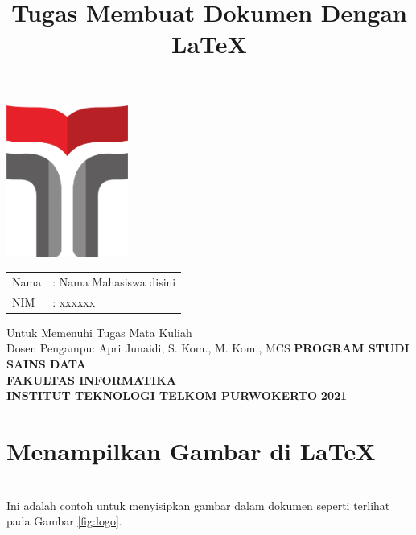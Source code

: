 \documentclass[a4paper,12 pt]{article}
\title{\textbf{Tugas Membuat Dokumen }\linebreak 
\textbf{Dengan \LaTeX}\linebreak}
\date{}
\begin{document}
\maketitle
\thispagestyle{empty}
\begin{center}
\includegraphics[width=4cm,height=5cm]{logo}
\end{center}


\vspace{0.5 cm}
\begin{center}
\begin{tabular}{ll}
Nama & : Nama Mahasiswa disini \\
NIM & : xxxxxx\\
\end{tabular}
\newline
\newline
\newline
Untuk Memenuhi Tugas Mata Kuliah \\
Dosen Pengampu: Apri Junaidi, S. Kom., M. Kom., MCS \linebreak
\newline
\newline
\textbf {PROGRAM STUDI SAINS DATA} \\
\textbf {FAKULTAS INFORMATIKA} \\
\textbf {INSTITUT TEKNOLOGI TELKOM PURWOKERTO}
\linebreak
\textbf {2021} \linebreak
\end{center}

\pagebreak

\tableofcontents
\pagebreak

\listoffigures
\pagebreak

\section{Menampilkan Gambar di \LaTeX}
\blindtext\\
\linebreak
Ini adalah contoh untuk  menyisipkan gambar dalam dokumen seperti terlihat pada Gambar \ref{fig:logo}.
\end{document}
